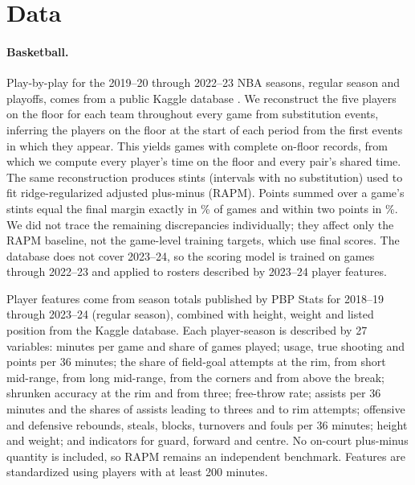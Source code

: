 \section{Data}
\label{sec:data}

\paragraph{Basketball.} Play-by-play for the 2019--20 through 2022--23 NBA seasons, regular season and playoffs, comes from a public Kaggle database \citep{walsh2026}. We reconstruct the five players on the floor for each team throughout every game from substitution events, inferring the players on the floor at the start of each period from the first events in which they appear. This yields  games with complete on-floor records, from which we compute every player's time on the floor and every pair's shared time. The same reconstruction produces  stints (intervals with no substitution) used to fit ridge-regularized adjusted plus-minus (RAPM). Points summed over a game's stints equal the final margin exactly in \% of games and within two points in \%. We did not trace the remaining discrepancies individually; they affect only the RAPM baseline, not the game-level training targets, which use final scores. The database does not cover 2023--24, so the scoring model is trained on games through 2022--23 and applied to rosters described by 2023--24 player features.

Player features come from season totals published by PBP Stats \citep{pbpstats} for 2018--19 through 2023--24 (regular season), combined with height, weight and listed position from the Kaggle database. Each player-season is described by 27 variables: minutes per game and share of games played; usage, true shooting and points per 36 minutes; the share of field-goal attempts at the rim, from short mid-range, from long mid-range, from the corners and from above the break; shrunken accuracy at the rim and from three; free-throw rate; assists per 36 minutes and the shares of assists leading to threes and to rim attempts; offensive and defensive rebounds, steals, blocks, turnovers and fouls per 36 minutes; height and weight; and indicators for guard, forward and centre. No on-court plus-minus quantity is included, so RAPM remains an independent benchmark. Features are standardized using players with at least 200 minutes.

